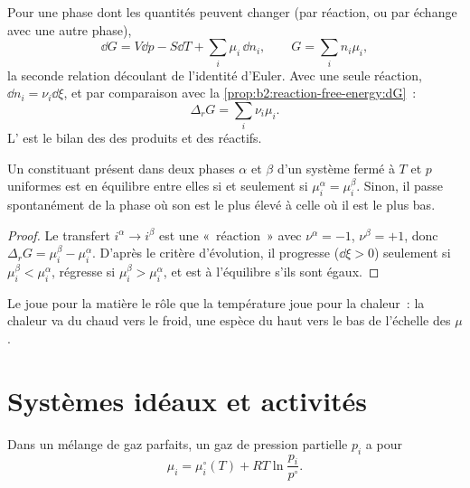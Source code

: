 Pour une phase dont les quantités peuvent changer (par réaction, ou par échange avec
une autre phase),
\[
  \dd G = V\dd p - S\dd T + \sum_i\mu_i\,\dd n_i ,\qquad G = \sum_i n_i\mu_i ,
\]
la seconde relation découlant de l'identité d'Euler. Avec une seule réaction, $\dd n_i =
\nu_i\dd\xi$, et par comparaison avec la \cref{prop:b2:reaction-free-energy:dG}~:
\[
  \Delta_r G = \sum_i\nu_i\mu_i .
\]
L' est le bilan des  des
produits et des réactifs.

\begin{theorem}\label{thm:b2:chemical-potential:phase-equilibrium}
Un constituant présent dans deux phases $\alpha$ et $\beta$ d'un système fermé à
$T$ et $p$ uniformes est en équilibre entre elles si et seulement si
$\mu_i^\alpha = \mu_i^\beta$. Sinon, il passe spontanément de la
phase où son  est le plus élevé à celle où il est le plus bas.
\end{theorem}

\begin{proof}
Le transfert $i^\alpha \to i^\beta$ est une «~réaction~» avec $\nu^\alpha = -1$,
$\nu^\beta = +1$, donc $\Delta_r G = \mu_i^\beta - \mu_i^\alpha$. D'après le
critère d'évolution, il progresse ($\dd\xi > 0$) seulement si $\mu_i^\beta <
\mu_i^\alpha$, régresse si $\mu_i^\beta > \mu_i^\alpha$, et est à
l'équilibre s'ils sont égaux.
\end{proof}

Le  joue pour la matière le rôle que la température joue
pour la chaleur~: la chaleur va du chaud vers le froid, une espèce du haut vers le bas de l'échelle des $\mu$.

\section{Systèmes idéaux et activités}

\begin{proposition}\label{prop:b2:chemical-potential:mu-gas}
Dans un mélange de gaz parfaits, un gaz de pression partielle $p_i$ a pour 
\[
  \mu_i = \mu_i^\circ(T) + RT\ln\frac{p_i}{p^\circ} .
\]
\end{proposition}

